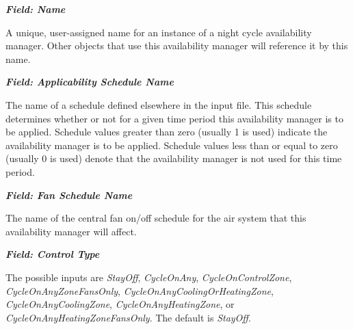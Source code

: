 \textbf{\emph{Field: Name}}

A unique, user-assigned name for an instance of a night cycle availability manager. Other objects that use this availability manager will reference it by this name.

\textbf{\emph{Field: Applicability Schedule Name}}

The name of a schedule defined elsewhere in the input file. This schedule determines whether or not for a given time period this availability manager is to be applied. Schedule values greater than zero (usually 1 is used) indicate the availability manager is to be applied. Schedule values less than or equal to zero (usually 0 is used) denote that the availability manager is not used for this time period.

\textbf{\emph{Field: Fan Schedule Name}}

The name of the central fan on/off schedule for the air system that this availability manager will affect.

\textbf{\emph{Field: Control Type}}

The possible inputs are \emph{StayOff}, \emph{CycleOnAny}, \emph{CycleOnControlZone}, \emph{CycleOnAnyZoneFansOnly}, \emph{CycleOnAnyCoolingOrHeatingZone}, \emph{CycleOnAnyCoolingZone}, \emph{CycleOnAnyHeatingZone}, or \emph{CycleOnAnyHeatingZoneFansOnly}. The default is \emph{StayOff}.

